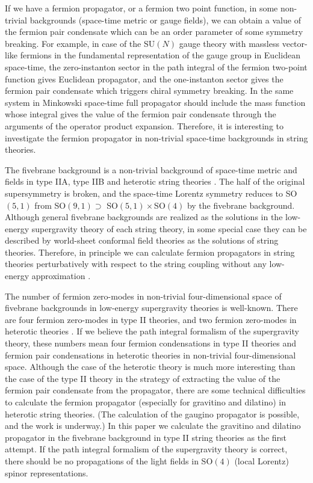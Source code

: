\documentclass[a4paper,prd,preprint]{revtex4}
\begin{document}
If we have a fermion propagator, or a fermion two point function,
 in some non-trivial backgrounds (space-time metric or gauge fields),
 we can obtain a value of the fermion pair condensate
 which can be an order parameter of some symmetry breaking.
For example,
 in case of the SU$(N)$ gauge theory
 with massless vector-like fermions
 in the fundamental representation of the gauge group
 in Euclidean space-time,
 the zero-instanton sector in the path integral
 of the fermion two-point function gives Euclidean propagator,
 and the one-instanton sector gives the fermion pair condensate
 which triggers chiral symmetry breaking.
In the same system in Minkowski space-time
 full propagator should include the mass function
 whose integral gives the value of the fermion pair condensate
 through the arguments of the operator product expansion.
Therefore,
 it is interesting to investigate the fermion propagator
 in non-trivial space-time backgrounds
 in string theories.

The fivebrane background
 is a non-trivial background of space-time metric and fields
 in type IIA, type IIB and heterotic string theories
 \cite{Rey1,CHS1,CHS2}.
The half of the original supersymmetry is broken,
 and the space-time Lorentz symmetry reduces to SO$(5,1)$
 from SO$(9,1) \supset$ SO$(5,1) \times$SO$(4)$
 by the fivebrane background.
Although
 general fivebrane backgrounds are realized as the solutions
 in the low-energy supergravity theory of each string theory,
 in some special case they can be described
 by world-sheet conformal field theories
 as the solutions of string theories\cite{Rey2,AFK}.
Therefore, in principle
 we can calculate fermion propagators in string theories
 perturbatively with respect to the string coupling
 without any low-energy approximation
 \cite{Fainberg-Marshakov,Marshakov}.

The number of fermion zero-modes
 in non-trivial four-dimensional space of fivebrane backgrounds
 in low-energy supergravity theories
 is well-known\cite{CHS2}.
There are
 four fermion zero-modes in type II theories\cite{Kitazawa1},
 and two fermion zero-modes in heterotic theories
 \cite{Katagiri-Kitazawa}.
If we believe
 the path integral formalism of the supergravity theory,
 these numbers mean
 four fermion condensations in type II theories
 and fermion pair condensations in heterotic theories
 in non-trivial four-dimensional space.
Although
 the case of the heterotic theory
 is much more interesting than the case of the type II theory
 in the strategy of extracting the value of
 the fermion pair condensate from the propagator,
 there are some technical difficulties to calculate
 the fermion propagator (especially for gravitino and dilatino)
 in heterotic string theories.
 (The calculation of the gaugino propagator is possible,
  and the work is underway.) 
In this paper
 we calculate the gravitino and dilatino propagator
 in the fivebrane background in type II string theories
 as the first attempt.
If the path integral formalism of the supergravity theory is correct,
 there should be no propagations of the light fields
 in SO$(4)$ (local Lorentz) spinor representations.
\end{document}
